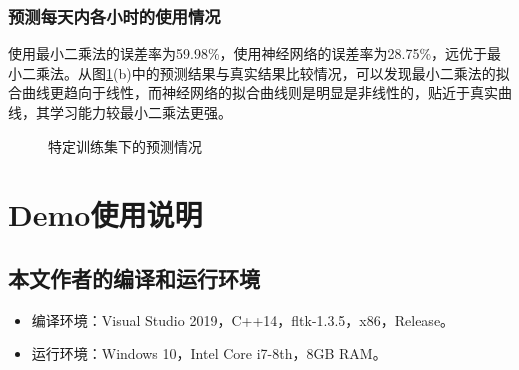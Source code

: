 \documentclass[CJK]{ctexart}
\begin{document}
\subsubsection{预测每天内各小时的使用情况}
使用最小二乘法的误差率为59.98\%，使用神经网络的误差率为28.75\%，远优于最小二乘法。从图\ref{fig:loss_2}(b)中的预测结果与真实结果比较情况，可以发现最小二乘法的拟合曲线更趋向于线性，而神经网络的拟合曲线则是明显是非线性的，贴近于真实曲线，其学习能力较最小二乘法更强。
\begin{figure}[htbp]
    \centering
    \centering
    \caption{特定训练集下的预测情况}
    \label{fig:loss_2}
\end{figure}
\section{Demo使用说明}
\subsection{本文作者的编译和运行环境}
\begin{itemize}
    \item 编译环境：Visual Studio 2019，C++14，fltk-1.3.5，x86，Release。
    \item 运行环境：Windows 10，Intel Core i7-8th，8GB RAM。
\end{itemize}
\end{document}
